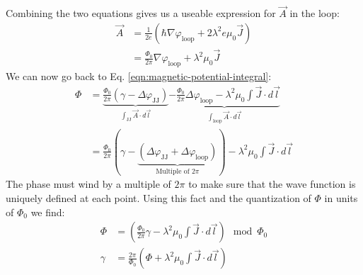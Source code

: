 Combining the two equations gives us a useable expression for $\vec{A}$ in the loop:
\begin{align}
	\vec{A} &= \frac{1}{2e}\left(\hbar \nabla \varphi_{\text{loop}} + 2\lambda^2e\mu_0\vec{J} \right) \nonumber \\
	&= \frac{\Phi_0}{2\pi} \nabla \varphi_{\text{loop}} + \lambda^2\mu_0\vec{J}
\end{align}
We can now go back to Eq. \ref{eqn:magnetic-potential-integral}:
\begin{align}
	\Phi &= \underbrace{\frac{\Phi_0}{2\pi} \left(\gamma - \Delta\varphi_{\text{JJ}}\right)}_{\int_{\text{JJ}}\vec{A} \cdot d\vec{l}} \underbrace{- \frac{\Phi_0}{2\pi}\Delta \varphi_{\text{loop}} - \lambda^2\mu_0 \int \vec{J}\cdot d \vec{l}}_{\int_{\text{loop}}\vec{A}\cdot d\vec{l}} \nonumber \\
	&= \frac{\Phi_0}{2\pi} \left(\gamma - \underbrace{\left(\Delta\varphi_{\text{JJ}} + \Delta\varphi_{\text{loop}}\right)}_{\text{Multiple of } 2\pi} \right) - \lambda^2\mu_0 \int \vec{J}\cdot d \vec{l}
\end{align}
The phase must wind by a multiple of $2\pi$ to make sure that the wave function is uniquely defined at each point. Using this fact and the quantization of $\Phi$ in units of $\Phi_0$ we find:
\begin{align}
	\Phi &= \left(\frac{\Phi_0}{2\pi}\gamma - \lambda^2\mu_0 \int \vec{J}\cdot d \vec{l} \right) \mod \Phi_0 \\ 
	\gamma &= \frac{2\pi}{\Phi_0}\left(\Phi + \lambda^2\mu_0 \int \vec{J}\cdot d \vec{l} \right)
\end{align}

